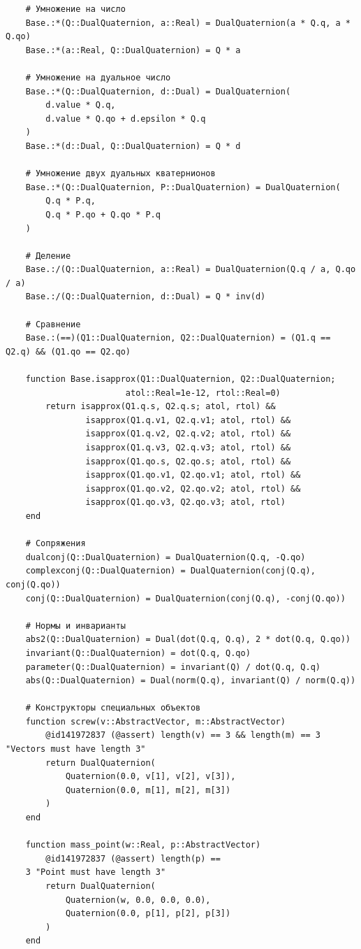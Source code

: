 \begin{verbatim}
    # Умножение на число
    Base.:*(Q::DualQuaternion, a::Real) = DualQuaternion(a * Q.q, a * Q.qo)
    Base.:*(a::Real, Q::DualQuaternion) = Q * a

    # Умножение на дуальное число
    Base.:*(Q::DualQuaternion, d::Dual) = DualQuaternion(
        d.value * Q.q,
        d.value * Q.qo + d.epsilon * Q.q
    )
    Base.:*(d::Dual, Q::DualQuaternion) = Q * d

    # Умножение двух дуальных кватернионов
    Base.:*(Q::DualQuaternion, P::DualQuaternion) = DualQuaternion(
        Q.q * P.q,
        Q.q * P.qo + Q.qo * P.q
    )

    # Деление
    Base.:/(Q::DualQuaternion, a::Real) = DualQuaternion(Q.q / a, Q.qo / a)
    Base.:/(Q::DualQuaternion, d::Dual) = Q * inv(d)

    # Сравнение
    Base.:(==)(Q1::DualQuaternion, Q2::DualQuaternion) = (Q1.q == Q2.q) && (Q1.qo == Q2.qo)

    function Base.isapprox(Q1::DualQuaternion, Q2::DualQuaternion;
                        atol::Real=1e-12, rtol::Real=0)
        return isapprox(Q1.q.s, Q2.q.s; atol, rtol) &&
                isapprox(Q1.q.v1, Q2.q.v1; atol, rtol) &&
                isapprox(Q1.q.v2, Q2.q.v2; atol, rtol) &&
                isapprox(Q1.q.v3, Q2.q.v3; atol, rtol) &&
                isapprox(Q1.qo.s, Q2.qo.s; atol, rtol) &&
                isapprox(Q1.qo.v1, Q2.qo.v1; atol, rtol) &&
                isapprox(Q1.qo.v2, Q2.qo.v2; atol, rtol) &&
                isapprox(Q1.qo.v3, Q2.qo.v3; atol, rtol)
    end

    # Сопряжения
    dualconj(Q::DualQuaternion) = DualQuaternion(Q.q, -Q.qo)
    complexconj(Q::DualQuaternion) = DualQuaternion(conj(Q.q), conj(Q.qo))
    conj(Q::DualQuaternion) = DualQuaternion(conj(Q.q), -conj(Q.qo))

    # Нормы и инварианты
    abs2(Q::DualQuaternion) = Dual(dot(Q.q, Q.q), 2 * dot(Q.q, Q.qo))
    invariant(Q::DualQuaternion) = dot(Q.q, Q.qo)
    parameter(Q::DualQuaternion) = invariant(Q) / dot(Q.q, Q.q)
    abs(Q::DualQuaternion) = Dual(norm(Q.q), invariant(Q) / norm(Q.q))

    # Конструкторы специальных объектов
    function screw(v::AbstractVector, m::AbstractVector)
        @id141972837 (@assert) length(v) == 3 && length(m) == 3 "Vectors must have length 3"
        return DualQuaternion(
            Quaternion(0.0, v[1], v[2], v[3]),
            Quaternion(0.0, m[1], m[2], m[3])
        )
    end

    function mass_point(w::Real, p::AbstractVector)
        @id141972837 (@assert) length(p) ==
    3 "Point must have length 3"
        return DualQuaternion(
            Quaternion(w, 0.0, 0.0, 0.0),
            Quaternion(0.0, p[1], p[2], p[3])
        )
    end


\end{verbatim}
